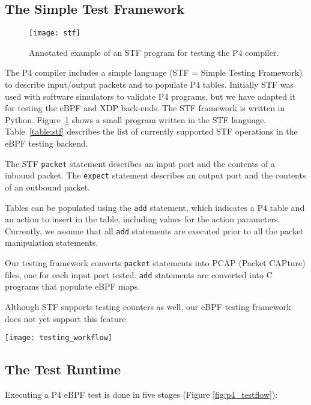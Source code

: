 \subsection{The Simple Test Framework}
\begin{figure}[h]
  \centering
  \texttt{[image: stf]}
  \caption{Annotated example of an STF program for testing the P4 compiler.}
  \label{fig:stf}
\end{figure}

The P4 compiler includes a simple language (STF = Simple Testing
Framework) to describe input/output packets and to populate P4 tables.
Initially STF was used with software simulators to validate P4
programs, but we have adapted it for testing the eBPF and XDP
back-ends.  The STF framework is written in Python.
Figure~\ref{fig:stf} shows a small program written in the STF
language.  Table~\ref{table:stf} describes the list of currently
supported STF operations in the eBPF testing backend.

The STF \texttt{packet} statement describes an input port and the
contents of a inbound packet.  The \texttt{expect} statement describes
an output port and the contents of an outbound packet.

Tables can be populated using the \texttt{add} statement, which
indicates a P4 table and an action to insert in the table, including
values for the action parameters. Currently, we assume that all
\texttt{add} statements are executed prior to all the packet
manipulation statements.

Our testing framework converts \texttt{packet} statements into PCAP
(Packet CAPture) files, one for each input port tested.  \texttt{add}
statements are converted into C programs that populate eBPF maps.

Although STF supports testing counters as well, our eBPF testing
framework does not yet support this feature.

\begin{figure*}
	\centering
	\texttt{[image: testing\_workflow]}
	\caption{Testing workflow for a P4-eBPF program. Environment and
		target are provided by the user.}
	\label{fig:p4_testflow}
\end{figure*}

\subsection{The Test Runtime}


Executing a P4 eBPF test is done in five stages (Figure
\ref{fig:p4_testflow}):

